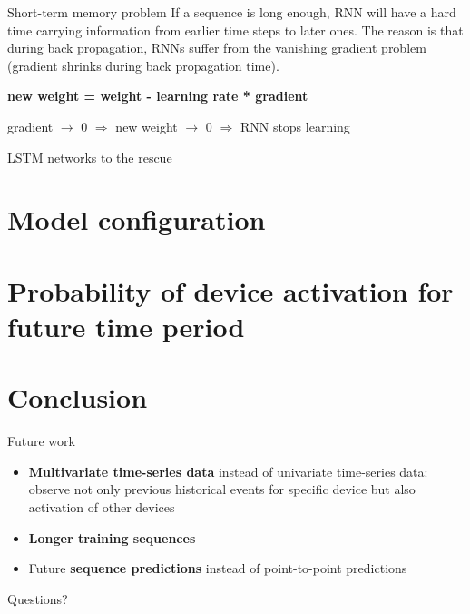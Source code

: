 \documentclass{beamer}
\begin{document}
  \begin{frame}{Short-term memory problem}
    If a sequence is long enough, RNN will have a hard time carrying information from earlier time steps to later ones.
    The reason is that during back propagation, RNNs suffer from the vanishing gradient problem (gradient shrinks during back propagation time).
    \begin{center}
      \textbf{new weight = weight - learning rate * gradient}

      gradient $\rightarrow$ 0 $\Rightarrow$ new weight $\rightarrow$ 0 $\Rightarrow$ RNN stops learning 
    \end{center}
  \end{frame}

  \begin{frame}{LSTM networks to the rescue}

  \end{frame}

  \section{Model configuration}

  \section{Probability of device activation for future time period}

  \section{Conclusion}
  \begin{frame}{Future work}
    \begin{itemize}
      \item \textbf{Multivariate time-series data} instead of univariate time-series data: observe not only previous historical events for specific device but also activation of other devices
      \item \textbf{Longer training sequences}
      \item Future \textbf{sequence predictions} instead of point-to-point predictions
    \end{itemize}
  \end{frame}

  \begin{frame}[standout]
    Questions?
  \end{frame}

  
\end{document}
